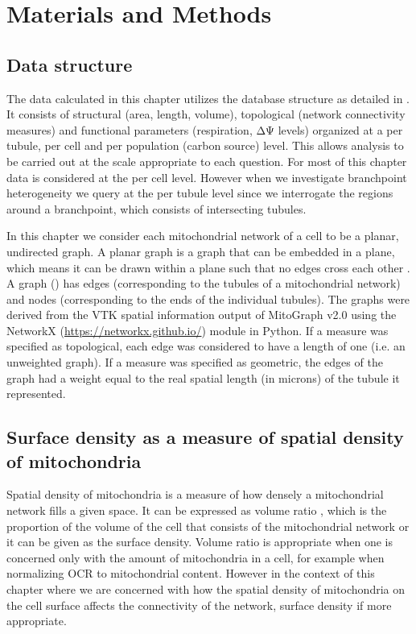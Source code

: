 \section{Materials and Methods}
\subsection{Data structure}
The data calculated in this chapter utilizes the database structure as detailed in . It consists of structural (area, length, volume), topological (network connectivity measures) and functional parameters (respiration, ΔΨ levels) organized at a per tubule, per cell and per population (carbon source) level. This allows analysis to be carried out at the scale appropriate to each question. For most of this chapter data is considered at the per cell level. However when we investigate branchpoint heterogeneity we query at the per tubule level since we interrogate the regions around a branchpoint, which consists of intersecting tubules. 

In this chapter we consider each mitochondrial network of a cell to be a planar, undirected graph. A planar graph is a graph that can be embedded in a plane, which means it can be drawn within a plane such that no edges cross each other \cite{west2001introduction}. A graph () has edges (corresponding to the tubules of a mitochondrial network) and nodes (corresponding to the ends of the individual tubules). The graphs were derived from the VTK spatial information output of MitoGraph v2.0 using the NetworkX (\url{https://networkx.github.io/}) module in Python. If a measure was specified as topological, each edge was considered to have a length of one (i.e. an unweighted graph). If a measure was specified as geometric, the edges of the graph had a weight equal to the real spatial length (in microns) of the tubule it represented.
 
\subsection{Surface density as a measure of spatial density of mitochondria}
Spatial density of mitochondria is a measure of how densely a mitochondrial network fills a given space. It can be expressed as volume ratio \cite{rafelski_mitochondrial_2012}, which is the proportion of the volume of the cell that consists of the mitochondrial network or it can be given as the surface density.
Volume ratio is appropriate when one is concerned only with the amount of mitochondria in a cell, for example when normalizing OCR to mitochondrial content. However in the context of this chapter where we are concerned with how the spatial density of mitochondria on the cell surface affects the connectivity of the network, surface density if more appropriate.  


